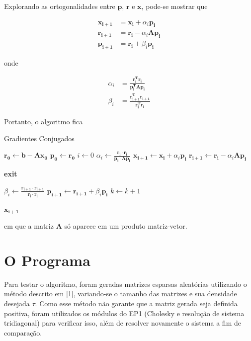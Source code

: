 \documentclass[a4paper,11pt]{article}
\begin{document}
    Explorando as ortogonalidades entre $\mathbf{p}$, $\mathbf{r}$ e $\mathbf{x}$, pode-se mostrar que

    \begin{align*}
        \mathbf{x_{i+1}} &= \mathbf{x_i} + \alpha_i\mathbf{p_i}  \\
        \mathbf{r_{i+1}} &= \mathbf{r_i} - \alpha_i\mathbf{Ap_i} \\
        \mathbf{p_{i+1}} &= \mathbf{r_i} + \beta_i\mathbf{p_i}
    \end{align*}

    onde

    \begin{align*}
        \alpha_i &= \mathbf{\frac{r_i^Tr_i}{p_i^TAp_i}} \\
        \beta_i  &= \mathbf{\frac{r_{i+1}^Tr_{i+1}}{r_i^Tr_i}}
    \end{align*}

    Portanto, o algoritmo fica
    \begin{algorithm}
        \caption{Gradientes Conjugados}
        \begin{algorithmic}[1]
            \State $\mathbf{r_0} \gets \mathbf{b - Ax_0}$
            \State $\mathbf{p_0} \gets \mathbf{r_0}$
            \State $i \gets 0$
            \Loop
                \State $\alpha_i \gets \frac{\mathbf{r_i}\cdot\mathbf{r_i}}{\mathbf{p_i\cdot Ap_i}}$
                \State $\mathbf{x_{i+1}} \gets \mathbf{x_i} + \alpha_i\mathbf{p_i}$
                \State $\mathbf{r_{i+1}} \gets \mathbf{r_i} - \alpha_i\mathbf{Ap_i}$


                    \textbf{exit}
                \EndIf

                \State $\beta_i \gets \frac{\mathbf{r_{i+1}}\cdot\mathbf{r_{i+1}}}{\mathbf{r_i}\cdot\mathbf{r_i}}$
                \State $\mathbf{p_{i+1}} \gets \mathbf{r_{i+1}} + \beta_i\mathbf{p_i}$
                \State $k \gets k + 1$
            \EndLoop

        \Return $\mathbf{x_{i+1}}$

        \end{algorithmic}
    \end{algorithm}

    em que a matriz $\mathbf{A}$ só aparece em um produto matriz-vetor.

  \section*{O Programa}
    Para testar o algoritmo, foram geradas matrizes esparsas aleatórias utilizando o método descrito em [1], variando-se o tamanho das matrizes
    e sua densidade desejada $\tau$.
    Como esse método não garante que a matriz gerada seja definida positiva, foram utilizados os módulos do EP1 (Cholesky e resolução de sistema tridiagonal)
    para verificar isso, além de resolver novamente o sistema a fim de comparação.
\end{document}
